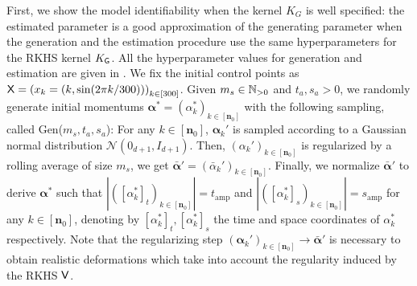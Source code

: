 First, we show the model identifiability when the kernel $K_G$ is well specified: the estimated parameter is a good approximation of the generating parameter when the generation and the estimation procedure use the same hyperparameters for the RKHS kernel $K_{\mathsf{G}}$.
All the hyperparameter values for generation and estimation are given in .
We fix the initial control points as $\mathsf{X}=\left(x_k=(k,\sin(2\pi k/300))\right)_{k\in[300]} $.
Given $m_{s}\in \mathbb{N}_{>0}$ and $t_{a},s_{a}>0$, we randomly generate initial momentums $\mathbf{\alpha}^*=(\alpha_k^*)_{k\in[\mathbf{n}_0]}$ with the following sampling, called Gen($m_s,t_a,s_a$):
 For any $k\in[\mathbf{n}_0]$, $\mathbf{\alpha}_k'$ is sampled according to a Gaussian normal distribution $\mathcal{N}(0_{d+1},I_{d+1})$.
Then, $(\alpha_k')_{k\in[\mathbf{n}_0]}$ is regularized by a rolling average of size $m_{s}$, we get $\bar{\mathbf{\alpha}}'=(\bar{\alpha}_k')_{k\in[\mathbf{n}_0]}$.
Finally, we normalize $\bar{\mathbf{\alpha}}'$ to derive $\mathbf{\alpha}^*$ such that $|([\alpha_k^*]_t)_{k\in[\mathbf{n}_0]}|=t_{\text{amp}}$ and $|([\alpha_k^*]_s)_{k\in[\mathbf{n}_0]}|=s_{\text{amp}}$ for any $k\in[\mathbf{n}_0]$, denoting by $[\alpha_k^*]_t,[\alpha_k^*]_s$ the time and space coordinates of $\alpha_k^*$ respectively.
Note that the regularizing step $(\mathbf{\alpha}_k')_{k\in[\mathbf{n}_0]}\to \bar{\mathbf{\alpha}}' $ is necessary to obtain realistic deformations which take into account the regularity induced by the RKHS $\mathsf{V}$.
